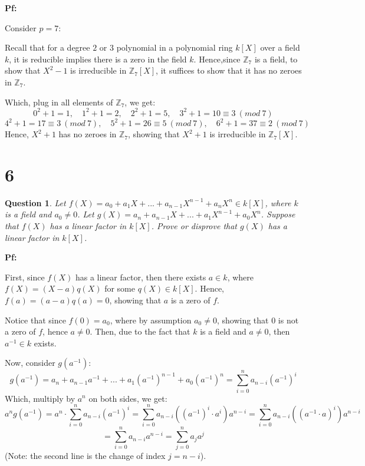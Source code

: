 \documentclass{article}
\newtheorem{question}{Question}
\begin{document}
\textbf{Pf:}

Consider $p=7$: 

Recall that for a degree $2$ or $3$ polynomial in a polynomial ring $k[X]$ over a field $k$,
it is reducible implies there is a zero in the field $k$. Hence,since $\mathbb{Z}_7$ is a field,
to show that $X^2-1$ is irreducible in $\mathbb{Z}_7[X]$, it suffices to show that it has no zeroes in $\mathbb{Z}_7$.

Which, plug in all elements of $\mathbb{Z}_7$, we get:
$$0^2+1 = 1,\quad 1^2+1 = 2,\quad 2^2+1 = 5,\quad 3^2+1 = 10 \equiv 3\ (mod\ 7)$$
$$4^2+1 = 17\equiv 3\ (mod\ 7),\quad 5^2+1 = 26 \equiv 5\ (mod\ 7),\quad 6^2+1 = 37 \equiv 2\ (mod\ 7)$$
Hence, $X^2+1$ has no zeroes in $\mathbb{Z}_7$, showing that $X^2+1$ is irreducible in $\mathbb{Z}_7[X]$.

\break

\section*{6}
\begin{myBox}[]{}
    \begin{question}
        Let $f (X) = a_0 + a_1X + ... + a_{n-1}X^{n-1} + a_nX^n \in k[X]$, where $k$ is a field and $a_0\neq 0$.
        Let $g(X) = a_n + a_{n-1}X +... + a_1X^{n-1} + a_0X^n$. Suppose that $f (X)$ has a linear factor in
        $k[X]$. Prove or disprove that $g(X)$ has a linear factor in $k[X]$.
    \end{question}
\end{myBox}

\textbf{Pf:}

First, since $f(X)$ has a linear factor, then there exists $a\in k$, where $f(X)=(X-a)q(X)$ for some $q(X)\in k[X]$.
Hence, $f(a) = (a-a)q(a)=0$, showing that $a$ is a zero of $f$.

Notice that since $f(0)=a_0$, where by assumption $a_0\neq 0$, showing that $0$ is not a zero of $f$, hence $a\neq 0$.
Then, due to the fact that $k$ is a field and $a\neq 0$, then $a^{-1}\in k$ exists.

\hfill

Now, consider $g(a^{-1})$:
$$g(a^{-1}) = a_n+a_{n-1}a^{-1}+...+a_1(a^{-1})^{n-1}+a_0(a^{-1})^n=\sum_{i=0}^{n}a_{n-i}(a^{-1})^i$$
Which, multiply by $a^n$ on both sides, we get:
$$a^ng(a^{-1})=a^n\cdot \sum_{i=0}^{n}a_{n-i}(a^{-1})^i = \sum_{i=0}^{n}a_{n-i}\left((a^{-1})^i\cdot a^i\right)a^{n-i}=\sum_{i=0}^{n}a_{n-i}\left((a^{-1}\cdot a)^i\right)a^{n-i}$$
$$ = \sum_{i=0}^{n}a_{n-i}a^{n-i} = \sum_{j=0}^{n}a_ja^j$$
(Note: the second line is the change of index $j=n-i$).
\end{document}
